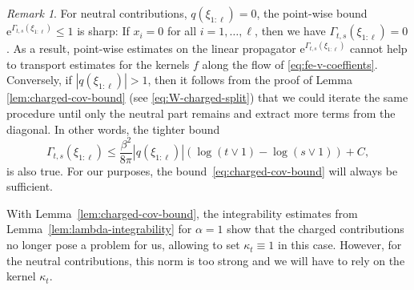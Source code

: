 \documentclass[11pt, a4paper]{scrartcl}
\numberwithin{equation}{section}
\theoremstyle{plain}
\theoremstyle{remark}
\newtheorem{remark}[foo]{Remark}
\newcommand{\mathe}{\mathrm{e}}
\begin{document}
\begin{remark}
  \label{rem:charge}For neutral contributions, $q (\xi_{1 : \ell}) = 0$, the
  point-wise bound $\mathe^{\Gamma_{t, s} (\xi_{1 : \ell})} \leqslant 1$ is sharp:
  If $x_i = 0$ for all $i = 1, \ldots, \ell$, then we have $\Gamma_{t, s} (\xi_{1 :
  \ell}) = 0$. As a result, point-wise estimates on the linear propagator
  $\mathe^{\Gamma_{t, s} (\xi_{1 : \ell})}$ cannot help to transport estimates for
  the kernels $f$ along the flow of \eqref{eq:fe-v-coeffients}. Conversely, if
  $| q (\xi_{1 : \ell}) | > 1$, then it follows from the proof of Lemma
  \ref{lem:charged-cov-bound} (see \eqref{eq:W-charged-split}) that we could
  iterate the same procedure until only the neutral part remains and extract
  more terms from the diagonal. In other words, the tighter bound
  \[ \Gamma_{t, s} (\xi_{1 : \ell}) \leqslant \frac{\beta^2}{8 \pi} | q (\xi_{1 :
     \ell}) | (\log (t \vee 1) - \log (s \vee 1)) + C, \]
  is also true. For our purposes, the bound~\eqref{eq:charged-cov-bound} will
  always be sufficient.
\end{remark}

With Lemma~\ref{lem:charged-cov-bound}, the integrability estimates from
Lemma~\ref{lem:lambda-integrability} for $\alpha = 1$ show that the charged
contributions no longer pose a problem for us, allowing to set $\kappa_t \equiv 1$
in this case. However, for the neutral contributions, this norm is too strong
and we will have to rely on the kernel $\kappa_t$.
\end{document}
